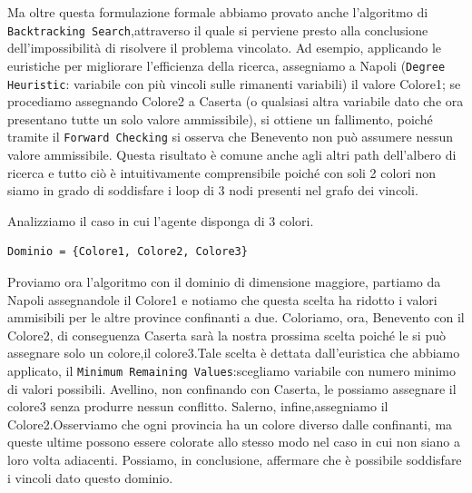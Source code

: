 		Ma oltre questa formulazione formale abbiamo provato anche l'algoritmo di \texttt{Backtracking Search},attraverso il quale si perviene presto alla conclusione dell'impossibilità di risolvere il problema vincolato. Ad esempio, applicando le euristiche per migliorare l'efficienza della ricerca, assegniamo a Napoli (\texttt{Degree Heuristic}: variabile con più vincoli sulle rimanenti variabili) il valore Colore1; se procediamo assegnando Colore2 a Caserta (o qualsiasi altra variabile dato che ora presentano tutte un solo valore ammissibile), si ottiene un fallimento, poiché tramite il \texttt{Forward Checking} si osserva che Benevento non può assumere nessun valore ammissibile. Questa risultato è comune anche agli altri path dell'albero di ricerca e tutto ciò è intuitivamente comprensibile poiché con soli 2 colori non siamo in grado di soddisfare i loop di 3 nodi presenti nel grafo dei vincoli.\par
		\bigskip
		Analizziamo il caso in cui l'agente disponga di 3 colori.
		\begin{lstlisting}
Dominio = {Colore1, Colore2, Colore3}
		\end{lstlisting}
		Proviamo ora l'algoritmo con il dominio di dimensione maggiore, partiamo da Napoli assegnandole il Colore1 e notiamo che questa scelta ha ridotto i valori ammisibili per le altre province confinanti a due. Coloriamo, ora, Benevento con il Colore2, di conseguenza Caserta sarà la nostra prossima scelta poiché le si può assegnare solo un colore,il colore3.Tale scelta è dettata dall'euristica che abbiamo applicato, il \texttt{Minimum Remaining Values}:scegliamo variabile con numero minimo di valori possibili. Avellino, non confinando con Caserta, le possiamo assegnare il colore3 senza produrre nessun conflitto. Salerno, infine,assegniamo il Colore2.\newline Osserviamo che ogni provincia ha un colore diverso dalle confinanti, ma queste ultime  possono essere colorate allo stesso modo nel caso in cui non siano a loro volta adiacenti. Possiamo, in conclusione, affermare che è possibile soddisfare i vincoli dato questo dominio.
